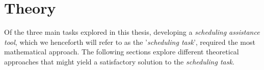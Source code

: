 \section{Theory}
Of the three main tasks explored in this thesis, developing a \textit{scheduling assistance tool}, which we henceforth will refer to as the '\textit{scheduling task}', required the most mathematical approach. 
The following sections explore different theoretical approaches that might yield a satisfactory solution to the \textit{scheduling task}.




